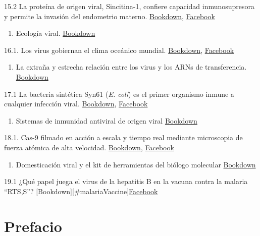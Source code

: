 \documentclass[
  12pt, krantz2,
  spanish,
]{krantz}
\providecommand{\tightlist}{%
  \setlength{\itemsep}{0pt}\setlength{\parskip}{0pt}}
\begin{document}
15.2 La proteína de origen viral, Sincitina-1, confiere capacidad inmunosupresora y permite la invasión del endometrio materno. \href{}{Bookdown}, \href{https://fb.watch/47zn4aTTy9/}{Facebook}

\begin{enumerate}
\def\labelenumi{\arabic{enumi}.}
\setcounter{enumi}{15}
\tightlist
\item
  Ecología viral. \href{}{Bookdown}
\end{enumerate}

16.1. Los virus gobiernan el clima oceánico mundial. \href{}{Bookdown}, \href{https://www.facebook.com/BioViral/videos/2866496176923128/}{Facebook}

\begin{enumerate}
\def\labelenumi{\arabic{enumi}.}
\setcounter{enumi}{16}
\tightlist
\item
  La extraña y estrecha relación entre los virus y los ARNs de transferencia. \href{}{Bookdown}
\end{enumerate}

17.1 La bacteria sintética Syn61 (\emph{E. coli}) es el primer organismo inmune a cualquier infección viral. \href{}{Bookdown}, \href{https://www.facebook.com/BioViral/posts/177374761056508}{Facebook}

\begin{enumerate}
\def\labelenumi{\arabic{enumi}.}
\setcounter{enumi}{17}
\tightlist
\item
  Sistemas de inmunidad antiviral de origen viral \href{}{Bookdown}
\end{enumerate}

18.1. Cas-9 filmado en acción a escala y tiempo real mediante microscopia de fuerza atómica de alta velocidad. \href{}{Bookdown}, \href{https://www.facebook.com/BioViral/posts/191468236313827}{Facebook}

\begin{enumerate}
\def\labelenumi{\arabic{enumi}.}
\setcounter{enumi}{18}
\tightlist
\item
  Domesticación viral y el kit de herramientas del biólogo molecular \href{}{Bookdown}
\end{enumerate}

19.1 ¿Qué papel juega el virus de la hepatitis B en la vacuna contra la malaria ``RTS,S''? {[}Bookdown{]}{[}\#malariaVaccine{]}\href{}{Facebook}

\hypertarget{prefacio}{%
\section*{Prefacio}\label{prefacio}}
\end{document}
